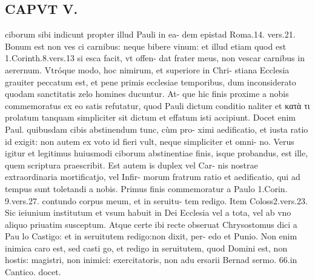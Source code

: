 \documentclass{article}
\begin{document}
\begin{pages}
\section*{CAPVT V. }
\marginpar{[ p.375 ]}\pstart ciborum sibi indicunt propter illud Pauli in ea- dem epistad Roma.14. vers.21. Bonum est non ves ci carnibus: neque bibere vinum: et illud etiam quod est 1.Corinth.8.vers.13 si esca facit, vt offen- dat frater meus, non vescar carnibus in aerernum. Vtróque  modo, hoc nimirum, et superiore in Chri- stiana Ecclesia grauiter peccatum est, et pene primis ecclesiae temporibus, dum inconsiderato quodam sanctitatis zelo homines ducuntur. At- que hic finis proxime a nobis commemoratus ex eo satis refutatur, quod Pauli dictum conditio naliter et κατὰ τι prolatum tanquam simpliciter sit dictum et effatum isti accipiunt. Docet enim Paul. quibusdam cibis abstinendum tunc, cùm pro- ximi aedificatio, et iusta ratio id exigit: non autem ex voto id fieri vult, neque simpliciter et omni- no. Verus igitur et legitimus huiusmodi ciborum abstinentiae finis, isque probandus, est ille, quem scriptura praescribit. Est autem is duplex vel Car- nis nostrae extraordinaria mortificatjo, vel Infir- morum fratrum ratio et aedificatio, qui ad tempus sunt toletandi a nobis.  \pend\pstart Primus finis commemoratur a Paulo 1.Corin. 9.vers.27. contundo corpus meum, et in seruitu- tem redigo. Item Coloss2.vers.23. Sic ieiunium institutum et vsum habuit in Dei Ecclesia vel a tota, vel ab vno aliquo priuatim susceptum. Atque  certe ibi recte obseruat Chrysostomus dici a Pau lo Castigo: et in seruitutem redigo:non dixit, per- edo et Punio. Non enim inimica caro est, sed casti go, et redigo in seruitutem, quod Domini est, non hostis: magistri, non inimici: exercitatoris, non adu ersarii Bernad sermo. 66.in Cantico. docet.  \pend

\end{pages}
\end{document}
